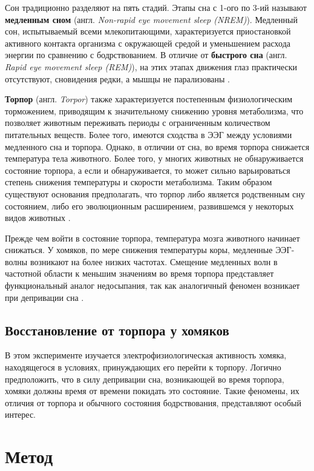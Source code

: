 \documentclass[12pt,a4paper,oneside]{article}
\begin{document}
Сон традиционно разделяют на пять стадий. Этапы сна с 1-ого по 3-ий называют \textbf{медленным сном} (англ. \textit{Non-rapid eye movement sleep (NREM)}). Медленный сон, испытываемый всеми млекопитающими, характеризуется приостановкой активного контакта организма с окружающей средой и уменьшением расхода энергии по сравнению с бодрствованием. В отличие от \textbf{быстрого сна} (англ. \textit{Rapid eye movement sleep (REM)}), на этих этапах движения глаз практически отсутствуют, сновидения редки, а мышцы не парализованы \cite{McCarley2007}. 

\textbf{Торпор} (англ. \textit{Torpor}) также характеризуется постепенным физиологическим торможением, приводящим к значительному снижению уровня метаболизма, что позволяет животным переживать периоды с ограниченным количеством питательных веществ. Более того, имеются сходства в ЭЭГ между условиями медленного сна и торпора. Однако, в отличии от сна, во время торпора снижается температура тела животного. Более того, у многих животных не обнаруживается состояние торпора, а если и обнаруживается, то может сильно варьироваться степень снижения температуры и скорости метаболизма. Таким образом существуют основания предполагать, что торпор либо является родственным сну состоянием, либо его эволюционным расширением, развившемся у некоторых видов животных \cite{Silvani2018}. 

Прежде чем войти в состояние торпора, температура мозга животного начинает снижаться. У хомяков, по мере снижения температуры коры, медленные ЭЭГ-волны возникают на более низких частотах. Смещение медленных волн в частотной области к меньшим значениям во время торпора представляет функциональный аналог недосыпания, так как аналогичный феномен возникает при депривации сна \cite{Silvani2018}.

\subsection{Восстановление от торпора у хомяков}

В этом эксперименте изучается электрофизиологическая активность хомяка, находящегося в условиях, принуждающих его перейти к торпору. Логично предположить, что в силу депривации сна, возникающей во время торпора, хомяки должны время от времени покидать это состояние. Такие феномены, их отличия от торпора и обычного состояния бодрствования, представляют особый интерес.

\newpage

\section{Метод} %
\end{document}

